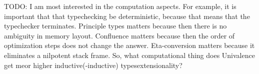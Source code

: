 \documentclass[11pt]{article} %
\theoremstyle{definition}
\theoremstyle{remark}
\begin{document}
TODO:
I am most interested in the computation aspects.
For example, it is important that that typechecking be deterministic, because that means that the typechecker terminates.
Principle types matters because then there is no ambiguity in memory layout.
Confluence matters because then the order of optimization steps does not change the answer.
Eta-conversion matters because it eliminates a nilpotent stack frame.
So, what computational thing does Univalence get me\qcomma or higher inductive(-inductive) types\qcomma extensionality?

\printbibliography
\end{document}
